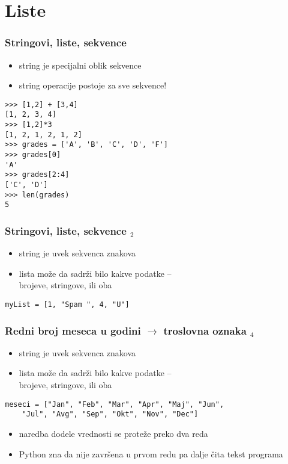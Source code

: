 \documentclass[utf8,compress,aspectratio=169]{beamer}
\begin{document}
\section{Liste}

\begin{frame}[fragile]
  \frametitle{Stringovi, liste, sekvence}
  \begin{itemize}
    \item string je specijalni oblik sekvence
    \item string operacije postoje za sve sekvence!
  \end{itemize}
\begin{verbatim}
>>> [1,2] + [3,4]
[1, 2, 3, 4]
>>> [1,2]*3
[1, 2, 1, 2, 1, 2]
>>> grades = ['A', 'B', 'C', 'D', 'F']
>>> grades[0]
'A'
>>> grades[2:4]
['C', 'D']
>>> len(grades)
5
\end{verbatim}
\end{frame}

\begin{frame}[fragile]
  \frametitle{Stringovi, liste, sekvence $_2$}
  \begin{itemize}
    \item string je uvek sekvenca znakova
    \item lista može da sadrži bilo kakve podatke -- \\ brojeve, stringove, ili oba
  \end{itemize}
\begin{verbatim}
myList = [1, "Spam ", 4, "U"]
\end{verbatim}
\end{frame}

\begin{frame}[fragile]
  \frametitle{Redni broj meseca u godini $\rightarrow$ troslovna oznaka $_4$}
  \begin{itemize}
    \item string je uvek sekvenca znakova
    \item lista može da sadrži bilo kakve podatke -- \\ brojeve, stringove, ili oba
  \end{itemize}
\begin{verbatim}
meseci = ["Jan", "Feb", "Mar", "Apr", "Maj", "Jun",
    "Jul", "Avg", "Sep", "Okt", "Nov", "Dec"]
\end{verbatim}
  \begin{itemize}
    \item naredba dodele vrednosti se proteže preko dva reda
    \item Python zna da nije završena u prvom redu pa dalje čita tekst programa
  \end{itemize}
\end{frame}
\end{document}
